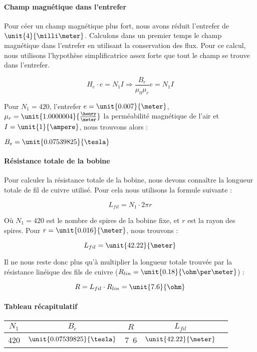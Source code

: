 \paragraph{Champ magnétique dans l'entrefer}
Pour céer un champ magnétique plus fort, nous avons réduit l'entrefer de $\unit{4}{\milli\meter}$.
Calculons dans un premier temps le champ magnétique dans l'entrefer en 
utilisant la conservation des flux. Pour ce calcul, nous utilisons l'hypothèse simplificatrice
assez forte que tout le champ se trouve dans l'entrefer.

$$H_e \cdot e = N_1 I \Rightarrow \frac{B_e}{\mu_0 \mu_r} e = N_1 I$$

Pour $N_1 = 420$, l'entrefer $e = \unit{0.007}{\meter}$, $\mu_r = \unit{1.0000004}{\frac{\henry}{\meter}}$ la perméabilité magnétique
de l'air et $I = \unit{1}{\ampere}$, nous trouvons alors :

$B_e = \unit{0.07539825}{\tesla}$

\paragraph{Résistance totale de la bobine}
Pour calculer la résistance totale de la bobine, nous devons connaître la longueur totale de fil de cuivre utilisé.
Pour cela nous utilisons la formule suivante :

$$L_{fil} = N_1 \cdot 2\pi r$$  

Où $N_1 = 420$ est le nombre de spires de la bobine fixe, et $r$ est la rayon des spires. Pour
$r = \unit{0.016}{\meter}$, nous trouvons :

$$L_{fil} = \unit{42.22}{\meter}$$

Il ne nous reste donc plus qu'à multiplier la longueur totale trouvée par la résistance linéique des fils de cuivre
($R_{lin} = \unit{0.18}{\ohm\per\meter}$) :

$$R = L_{fil} \cdot R_{lin} = \unit{7.6}{\ohm}$$


\paragraph{Tableau récapitulatif}

\begin{center}
	\begin{tabular}{c|c|c|c|c}
		$N_1$ & $B_e$ & $R$ & $L_{fil}$ \\
		\hline
		420 & $\unit{0.07539825}{\tesla}$ & \unit{7.6}{\ohm} &  $\unit{42.22}{\meter}$\\
	\end{tabular}
\end{center}

